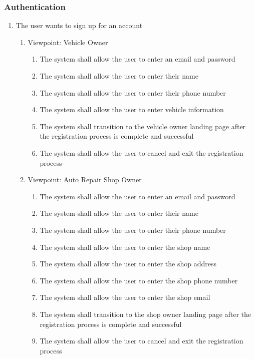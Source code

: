 \documentclass[12pt]{article}
\begin{document}
\subsubsection{Authentication}
\begin{enumerate}[label=BE\arabic*., series=business_events]
	\item The user wants to sign up for an account
	      \begin{enumerate}[VP\arabic*.]
		      \item Viewpoint: Vehicle Owner
		            \begin{enumerate}
			            \item The system shall allow the user to enter an email and password
			            \item The system shall allow the user to enter their name
			            \item The system shall allow the user to enter their phone number
			            \item The system shall allow the user to enter vehicle information
			            \item The system shall transition to the vehicle owner landing page after the registration process is
			                  complete and successful
			            \item The system shall allow the user to cancel and exit the registration process
		            \end{enumerate}

		      \item Viewpoint: Auto Repair Shop Owner
		            \begin{enumerate}
			            \item The system shall allow the user to enter an email and password
			            \item The system shall allow the user to enter their name
			            \item The system shall allow the user to enter their phone number
			            \item The system shall allow the user to enter the shop name
			            \item The system shall allow the user to enter the shop address
			            \item The system shall allow the user to enter the shop phone number
			            \item The system shall allow the user to enter the shop email
			            \item The system shall transition to the shop owner landing page after the registration process is
			                  complete and successful
			            \item The system shall allow the user to cancel and exit the registration process
		            \end{enumerate}


\end{enumerate}
\end{enumerate}
\end{document}
